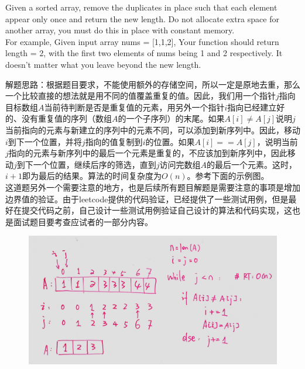 \documentclass[a4paper,10pt]{article}
\begin{document}
Given a sorted array, remove the duplicates in place such that each element appear only once and return the new length. Do not allocate extra space for another array, you must do this in place with constant memory. \\

\noindent For example, Given input array nums = [1,1,2], Your function should return length = 2, with the first two elements of nums being 1 and 2 respectively. It doesn't matter what you leave beyond the new length. \\

\begin{CJK*}{UTF8}{gbsn}
\noindent 解题思路：根据题目要求，不能使用额外的存储空间，所以一定是原地去重，那么一个比较直接的想法就是用不同的值覆盖重复的值。因此，我们用一个指针$j$指向目标数组$A$当前待判断是否是重复值的元素，用另外一个指针$i$指向已经建立好的、没有重复值的序列（数组$A$的一个子序列）的末尾。如果$A[i] \neq A[j]$说明$j$当前指向的元素与新建立的序列中的元素不同，可以添加到新序列中。因此，移动$i$到下一个位置，并将$j$指向的值复制到$i$的位置。如果$A[i]==A[j]$，说明当前$j$指向的元素与新序列中的最后一个元素是重复的，不应该加到新序列中，因此移动$j$到下一个位置，继续后序的筛选，直到$j$访问完数组$A$的最后一个元素。这时，$i+1$即为最后的结果。算法的时间复杂度为$O(n)$。参考下面的示例图。\\
\noindent 这道题另外一个需要注意的地方，也是后续所有题目解题是需要注意的事项是增加边界值的验证。由于leetcode提供的代码验证，已经提供了一些测试用例，但是最好在提交代码之前，自己设计一些测试用例验证自己设计的算法和代码实现，这也是面试题目要考查应试者的一部分内容。
\end{CJK*}

\begin{figure}[h]
    \includegraphics[width=\textwidth]{leetcode26.jpg}
    \centering\\
\end{figure}
\end{document}
